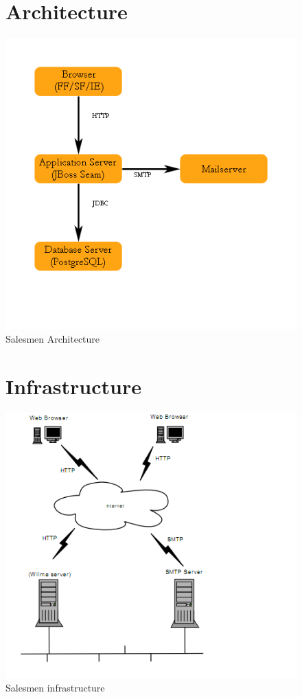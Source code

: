 \documentclass[salesmen, twoside]{../../../templates/latex/2009/softproj}
\begin{document}
\begin{projdoc}
\begin{figure}
\section{Architecture}
\label{fig_architecture}
\includegraphics[scale=0.8]{../../img/salesmen_architecture.png}
\caption{Salesmen Architecture}
\end{figure}

\begin{figure}
\section{Infrastructure}
\label{fig_infrastructure}
\includegraphics[scale=0.8]{../../img/infra1.png}
\caption{Salesmen infrastructure}
\end{figure}


\end{projdoc}
\end{document}
